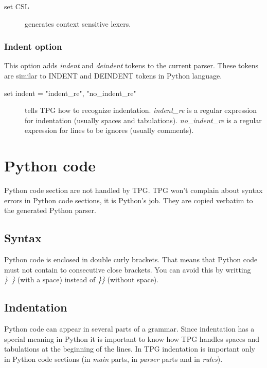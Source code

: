 \begin{description}
	\item [set CSL] generates context sensitive lexers.
\end{description}

\subsubsection{Indent option}                               \label{grammar:indent_option}

This option adds \emph{indent} and \emph{deindent} tokens to the current parser.
These tokens are similar to INDENT and DEINDENT tokens in Python language.

\begin{description}
    \item [set indent = "indent\_re", "no\_indent\_re"] tells TPG how to recognize indentation.
        \emph{indent\_re} is a regular expression for indentation (usually spaces and tabulations).
        \emph{no\_indent\_re} is a regular expression for lines to be ignores (usually comments).
\end{description}

\section{Python code}										\label{grammar:code}

Python code section are not handled by TPG.
TPG won't complain about syntax errors in Python code sections, it is Python's job.
They are copied verbatim to the generated Python parser.

\subsection{Syntax}

Python code is enclosed in double curly brackets.
That means that Python code must not contain to consecutive close brackets.
You can avoid this by writting \emph{\}~\}} (with a space) instead of \emph{\}\}} (without space).

\subsection{Indentation}

Python code can appear in several parts of a grammar.
Since indentation has a special meaning in Python it is important to know how TPG handles spaces and tabulations at the beginning of the lines.
In TPG indentation is important only in Python code sections (in \emph{main} parts, in \emph{parser} parts and in \emph{rules}).

